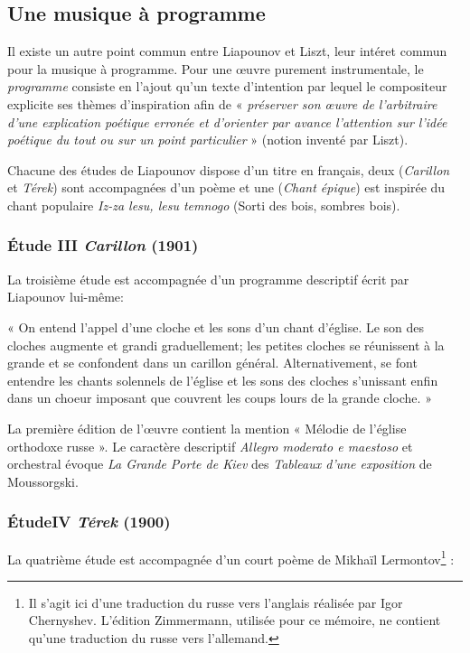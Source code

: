 \newpage

\subsection{Une musique à programme}

Il existe un autre point commun entre Liapounov et Liszt, leur intéret commun pour la musique à programme. Pour une œuvre purement instrumentale, le \emph{programme} consiste en l'ajout qu'un texte d'intention par lequel le compositeur explicite ses thèmes d'inspiration afin de « \emph{préserver son œuvre de l'arbitraire d'une explication poétique erronée et d'orienter par avance l'attention sur l'idée poétique du tout ou sur un point particulier} » (notion inventé par Liszt).

Chacune des études de Liapounov dispose d'un titre en français, deux (\emph{Carillon} et \emph{Térek}) sont accompagnées d'un poème et une (\emph{Chant épique}) est inspirée du chant populaire \emph{Iz-za lesu, lesu temnogo} (Sorti des bois, sombres bois).

\subsubsection{Étude III \emph{Carillon} (1901)}

La troisième étude est accompagnée d'un programme descriptif écrit par Liapounov lui-même:

« On entend l'appel d'une cloche et les sons d'un chant d'église. Le son des cloches augmente et grandi graduellement; les petites cloches se réunissent à la grande et se confondent dans un carillon général. Alternativement, se font entendre les chants solennels de l'église et les sons des cloches s’unissant enfin dans un choeur imposant que couvrent les coups lours de la grande cloche. »

La première édition de l'œuvre contient la mention « Mélodie de l’église orthodoxe russe ». Le caractère descriptif \emph{Allegro moderato e maestoso} et orchestral évoque \emph{La Grande Porte de Kiev} des \emph{Tableaux d'une exposition} de Moussorgski.

\subsubsection{ÉtudeIV \emph{Térek} (1900)}

La quatrième étude est accompagnée d'un court poème de Mikhaïl Lermontov\footnote{Il s'agit ici d'une traduction du russe vers l'anglais réalisée par Igor Chernyshev. L'édition Zimmermann, utilisée pour ce mémoire, ne contient qu'une traduction du russe vers l'allemand.} :

